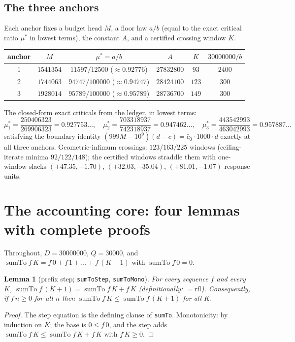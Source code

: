 \documentclass[11pt]{article}
\newcommand{\chat}{\widehat{c}}
\newcommand{\sumto}{\operatorname{sumTo}}
\theoremstyle{plain}
\newtheorem{lemma}{Lemma}[section]
\theoremstyle{definition}
\begin{document}
\subsection{The three anchors}

Each anchor fixes a budget head $M$, a floor law $a/b$ (equal to the exact critical ratio
$\mu^\ast$ in lowest terms), the constant $A$, and a certified crossing window $K$.

\begin{center}
\begin{tabular}{c c c c c c}
\hline
\textbf{anchor} & $M$ & $\mu^\ast=a/b$ & $A$ & $K$ & $30000000/b$\\
\hline
1 & $1541354$ & $11597/12500$ ($\approx 0.92776$) & $27832800$ & $93$ & $2400$\\
2 & $1744063$ & $94747/100000$ ($\approx 0.94747$) & $28424100$ & $123$ & $300$\\
3 & $1928014$ & $95789/100000$ ($\approx 0.95789$) & $28736700$ & $149$ & $300$\\
\hline
\end{tabular}
\end{center}

The closed-form exact criticals from the ledger, in lowest terms:
\[
\mu^\ast_1=\frac{250406323}{269906323}=0.927753\ldots,\quad
\mu^\ast_2=\frac{703318937}{742318937}=0.947462\ldots,\quad
\mu^\ast_3=\frac{443542993}{463042993}=0.957887\ldots
\]
satisfying the boundary identity $(999M-10^9)(d-c)=\chat_0\cdot 1000\cdot d$ exactly at all
three anchors. Geometric-infimum crossings: $123/163/225$ windows (ceiling-iterate minima
$92/122/148$); the certified windows straddle them with one-window slacks
$(+47.35,-1.70)$, $(+32.03,-35.04)$, $(+81.01,-1.07)$ response units.

\section{The accounting core: four lemmas with complete proofs}\label{sec:core}

Throughout, $D=30000000$, $Q=30000$, and $\sumto f\,K=f\,0+f\,1+\dots+f\,(K-1)$ with
$\sumto f\,0=0$.

\begin{lemma}[prefix step; \texttt{sumToStep}, \texttt{sumToMono}]\label{lem:step}
For every sequence $f$ and every $K$, $\sumto f\,(K+1)=\sumto f\,K+f\,K$ (definitionally:
$=\!\mathrm{rfl}$). Consequently, if $f\,n\ge 0$ for all $n$ then
$\sumto f\,K\le \sumto f\,(K+1)$ for all $K$.
\end{lemma}
\begin{proof}
The step equation is the defining clause of \texttt{sumTo}. Monotonicity: by induction on
$K$; the base is $0\le f\,0$, and the step adds $\sumto f\,K\le \sumto f\,K+f\,K$ with
$f\,K\ge 0$.
\end{proof}
\end{document}
